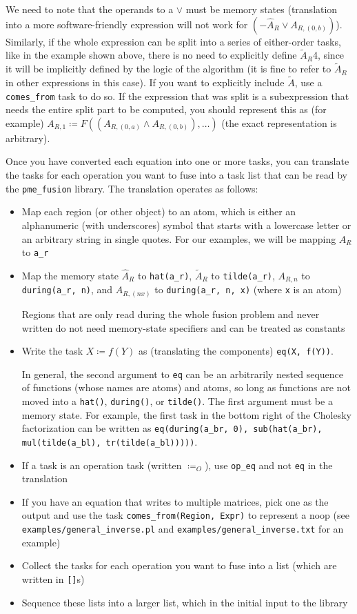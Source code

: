 \documentclass[12pt,letterpaper]{article}
\begin{document}
We need to note that the operands to a $\vee$ must be memory states (translation into a more software-friendly expression will not work for $(-\hat{A}_R \vee A_{R, (0, b)})$).
Similarly, if the whole expression can be split into a series of either-order tasks, like in the example shown above, there is no need to explicitly define $\widetilde{A}_R$4, since it will be implicitly defined by the logic of the algorithm (it is fine to refer to $\widetilde{A}_R$ in other expressions in this case).
If you want to explicitly include $\widetilde{A}$, use a \texttt{comes\_from} task to do so.
If the expression that was split is a subexpression that needs the entire split part to be computed, you should represent this as (for example) $A_{R, 1} \coloneqq F((A_{R, (0, a)} \wedge A_{R, (0, b)}), \ldots)$ (the exact representation is arbitrary).

Once you have converted each equation into one or more tasks, you can translate the tasks for each operation you want to fuse into a task list that can be read by the \texttt{pme\_fusion} library.
The translation operates as follows:
\begin{itemize}
\item Map each region (or other object) to an atom, which is either an alphanumeric (with underscores) symbol that starts with a lowercase letter or an arbitrary string in single quotes. For our examples, we will be mapping $A_R$ to \texttt{a\_r}
\item Map the memory state $\hat{A}_R$ to \texttt{hat(a\_r)}, $\widetilde{A}_R$ to \texttt{tilde(a\_r)}, $A_{R, n}$ to \texttt{during(a\_r, n)}, and $A_{R, (n x)}$ to \texttt{during(a\_r, n, x)} (where \texttt{x} is an atom)

  Regions that are only read during the whole fusion problem and never written do not need memory-state specifiers and can be treated as constants
\item Write the task $X \coloneqq f(Y)$ as (translating the components) \texttt{eq(X, f(Y))}.

  In general, the second argument to \texttt{eq} can be an arbitrarily nested sequence of functions (whose names are atoms) and atoms, so long as functions are not moved into a \texttt{hat()}, \texttt{during()}, or \texttt{tilde()}. The first argument must be a memory state.
  For example, the first task in the bottom right of the Cholesky factorization can be written as \texttt{eq(during(a\_br, 0), sub(hat(a\_br), mul(tilde(a\_bl), tr(tilde(a\_bl)))))}.
\item If a task is an operation task (written $\coloneqq_O$), use \texttt{op\_eq} and not \texttt{eq} in the translation
\item If you have an equation that writes to multiple matrices, pick one as the output and use the task \texttt{comes\_from(Region, Expr)} to represent a noop (see \texttt{examples/general\_inverse.pl} and \texttt{examples/general\_inverse.txt} for an example)
\item Collect the tasks for each operation you want to fuse into a list (which are written in \texttt{[]}s)
\item Sequence these lists into a larger list, which in the initial input to the library
\end{itemize}
\end{document}
